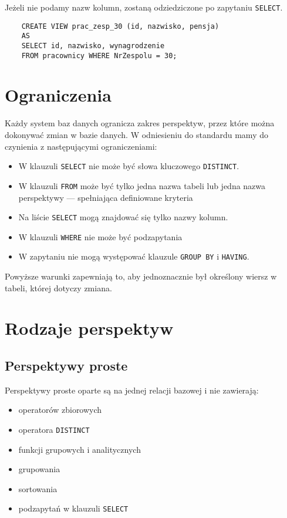 \documentclass[a4paper]{article}
\begin{document}
Jeżeli nie podamy nazw kolumn, zostaną odziedziczone po zapytaniu \texttt{SELECT}.

\begin{verbatim}
    CREATE VIEW prac_zesp_30 (id, nazwisko, pensja)
    AS
    SELECT id, nazwisko, wynagrodzenie
    FROM pracownicy WHERE NrZespolu = 30;
\end{verbatim}

\section{Ograniczenia}

Każdy system baz danych ogranicza zakres perspektyw, przez które można dokonywać zmian w bazie danych. W odniesieniu do standardu mamy do czynienia z następującymi ograniczeniami:

\begin{itemize}
    \item W klauzuli \texttt{SELECT} nie może być słowa kluczowego \texttt{DISTINCT}.
    \item W klauzuli \texttt{FROM} może być tylko jedna nazwa tabeli lub jedna nazwa perspektywy --- spełniająca definiowane kryteria
    \item Na liście \texttt{SELECT} mogą znajdować się tylko nazwy kolumn.
    \item W klauzuli \texttt{WHERE} nie może być podzapytania
    \item W zapytaniu nie mogą występować klauzule \texttt{GROUP BY} i \texttt{HAVING}.
\end{itemize}

Powyższe warunki zapewniają to, aby jednoznacznie był określony wiersz w tabeli, której dotyczy zmiana.

\section{Rodzaje perspektyw}

\subsection{Perspektywy proste}

Perspektywy proste oparte są na jednej relacji bazowej i nie zawierają:

\begin{itemize}
    \item operatorów zbiorowych
    \item operatora \texttt{DISTINCT}
    \item funkcji grupowych i analitycznych
    \item grupowania
    \item sortowania
    \item podzapytań w klauzuli \texttt{SELECT}
\end{itemize}
\end{document}
